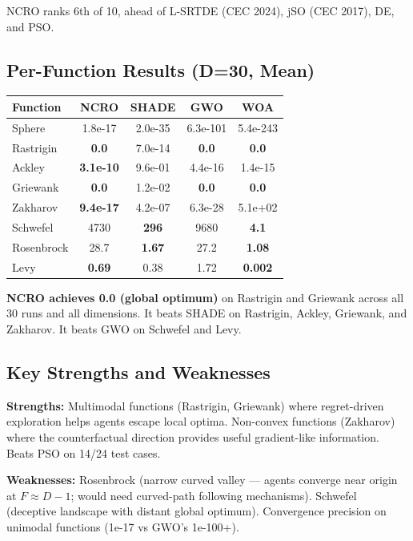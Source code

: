 \documentclass[10pt,twocolumn]{article}
\begin{document}
NCRO ranks 6th of 10, ahead of L-SRTDE (CEC 2024), jSO (CEC 2017), DE, and PSO.

\subsection{Per-Function Results (D=30, Mean)}

\begin{center}
\footnotesize
\begin{tabular}{lcccc}
\toprule
Function & NCRO & SHADE & GWO & WOA \\
\midrule
Sphere & 1.8e-17 & 2.0e-35 & 6.3e-101 & 5.4e-243 \\
Rastrigin & \textbf{0.0} & 7.0e-14 & \textbf{0.0} & \textbf{0.0} \\
Ackley & \textbf{3.1e-10} & 9.6e-01 & 4.4e-16 & 1.4e-15 \\
Griewank & \textbf{0.0} & 1.2e-02 & \textbf{0.0} & \textbf{0.0} \\
Zakharov & \textbf{9.4e-17} & 4.2e-07 & 6.3e-28 & 5.1e+02 \\
Schwefel & 4730 & \textbf{296} & 9680 & \textbf{4.1} \\
Rosenbrock & 28.7 & \textbf{1.67} & 27.2 & \textbf{1.08} \\
Levy & \textbf{0.69} & 0.38 & 1.72 & \textbf{0.002} \\
\bottomrule
\end{tabular}
\end{center}

\textbf{NCRO achieves 0.0 (global optimum)} on Rastrigin and Griewank across all 30 runs and all dimensions. It beats SHADE on Rastrigin, Ackley, Griewank, and Zakharov. It beats GWO on Schwefel and Levy.

\subsection{Key Strengths and Weaknesses}

\textbf{Strengths:} Multimodal functions (Rastrigin, Griewank) where regret-driven exploration helps agents escape local optima. Non-convex functions (Zakharov) where the counterfactual direction provides useful gradient-like information. Beats PSO on 14/24 test cases.

\textbf{Weaknesses:} Rosenbrock (narrow curved valley --- agents converge near origin at $F \approx D-1$; would need curved-path following mechanisms). Schwefel (deceptive landscape with distant global optimum). Convergence precision on unimodal functions (1e-17 vs GWO's 1e-100+).
\end{document}
